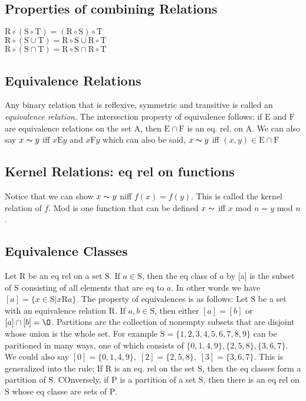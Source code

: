 \documentclass[10pt,twocolumn, letterpaper]{article}
\begin{document}
\subsection*{Properties of combining Relations}
$\mathrm{R} \circ (\mathrm{S} \circ \mathrm{T}) = (\mathrm{R} \circ \mathrm{S}) \circ \mathrm{T}$\\
$\mathrm{R} \circ (\mathrm{S} \cup \mathrm{T}) = \mathrm{R} \circ \mathrm{S} \cup \mathrm{R} \circ \mathrm{T}$\\
$\mathrm{R} \circ (\mathrm{S} \cap \mathrm{T}) = \mathrm{R} \circ \mathrm{S} \cap \mathrm{R} \circ \mathrm{T}$\\

\subsection*{Equivalence Relations}
Any binary relation that is reflexive, symmetric and transitive is called an \textit{equivalence relation}. The intersection property of equivalence
follows: if $\mathrm{E}$ and $\mathrm{F}$ are equivalence relations on the set $\mathrm{A}$, then $\mathrm{E} \cap \mathrm{F}$ is an eq. rel. on $\mathrm{A}$. 
We can also say $ x \thicksim y$ iff $x \mathrm{E} y $ and $ x \mathrm{F} y$ which can also be said, $x \thicksim y$ iff $ (x,y) \in \mathrm{E} \cap \mathrm{F}$

\subsection*{Kernel Relations: eq rel on functions}
Notice that we can show $x \thicksim y$ niff $f(x) = f(y)$. This is called the kernel relation of $f$. 
Mod is one function that can be defined $ x \thicksim$ iff $x$ mod $n = y$ mod $n$.

\subsection*{Equivalence Classes}
Let $\mathrm{R}$ be an eq rel on a set $\mathrm{S}$. If $ a \in \mathrm{S}$, then the eq class of $a$ by [a] is the subset of $\mathrm{S}$ consisting of all
elements that are eq to $a$. In other words we have $ [a] = \lbrace x \in \mathrm{S} \vert x \mathrm{R} a \rbrace$. 
The property of equivalences is as follows: Let $\mathrm{S}$ be a set with an equivalence relation $\mathrm{R}$. If $a,b \in \mathrm{S}$, 
then either $[a] = [b]$ or $[a] \cap [b] = \O$. Partitions are the collection of nonempty subsets that are disjoint whose union is the whole set. For 
example $\mathrm{S} = \lbrace 1, 2, 3, 4, 5, 6, 7, 8, 9 \rbrace$ can be paritioned in many ways, one of which consists 
of $\lbrace 0, 1, 4, 9\rbrace, \lbrace 2,5,8 \rbrace, \lbrace 3,6,7 \rbrace$. We could also say $[0] = \lbrace 0,1,4,9\rbrace,\; [2] = \lbrace 2,5,8\rbrace,\;
[3] = \lbrace 3,6,7 \rbrace$. This is generalized into the rule; If $\mathrm{R}$ is an eq. rel on the set $\mathrm{S}$, then the eq classes form a partition of
$\mathrm{S}$. COnversely, if $\mathrm{P}$ is a partition of a set $\mathrm{S}$, then there is an eq rel on $\mathrm{S}$ whose eq classe are sets of $\mathrm{P}$.
\end{document}
